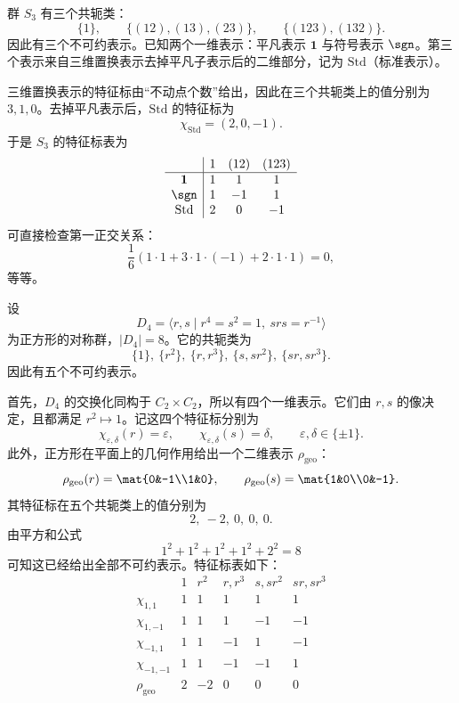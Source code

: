 \begin{example}[$S_3$ 的特征标表]
群 $S_3$ 有三个共轭类：
\[
\{1\},\qquad \{(12),(13),(23)\},\qquad \{(123),(132)\}.
\]
因此有三个不可约表示。已知两个一维表示：平凡表示 $\mathbf{1}$ 与符号表示 $\sgn$。第三个表示来自三维置换表示去掉平凡子表示后的二维部分，记为 $\mathrm{Std}$（标准表示）。

三维置换表示的特征标由“不动点个数”给出，因此在三个共轭类上的值分别为 $3,1,0$。去掉平凡表示后，$\mathrm{Std}$ 的特征标为
\[
\chi_{\mathrm{Std}}=(2,0,-1).
\]
于是 $S_3$ 的特征标表为
\[
\begin{array}{c|ccc}
 & 1 & (12) & (123)\\
\hline
\mathbf{1} & 1 & 1 & 1\\
\sgn & 1 & -1 & 1\\
\mathrm{Std} & 2 & 0 & -1
\end{array}
\]
可直接检查第一正交关系：
\[
\frac{1}{6}(1\cdot 1+3\cdot 1\cdot (-1)+2\cdot 1\cdot 1)=0,
\]
等等。
\end{example}

\begin{example}[$D_4$ 的特征标表]
设
\[
D_4=\langle r,s\mid r^4=s^2=1,\ srs=r^{-1}\rangle
\]
为正方形的对称群，$|D_4|=8$。它的共轭类为
\[
\{1\},\ \{r^2\},\ \{r,r^3\},\ \{s,sr^2\},\ \{sr,sr^3\}.
\]
因此有五个不可约表示。

首先，$D_4$ 的交换化同构于 $C_2\times C_2$，所以有四个一维表示。它们由 $r,s$ 的像决定，且都满足 $r^2\mapsto 1$。记这四个特征标分别为
\[
\chi_{\varepsilon,\delta}(r)=\varepsilon,\qquad \chi_{\varepsilon,\delta}(s)=\delta,
\qquad \varepsilon,\delta\in\{\pm 1\}.
\]
此外，正方形在平面上的几何作用给出一个二维表示 $\rho_{\mathrm{geo}}$：
\[
\rho_{\mathrm{geo}}(r)=\mat{0&-1\\1&0},
\qquad
\rho_{\mathrm{geo}}(s)=\mat{1&0\\0&-1}.
\]
其特征标在五个共轭类上的值分别为
\[
2,\ -2,\ 0,\ 0,\ 0.
\]
由平方和公式
\[
1^2+1^2+1^2+1^2+2^2=8
\]
可知这已经给出全部不可约表示。特征标表如下：
\[
\begin{array}{c|ccccc}
 & 1 & r^2 & r,r^3 & s,sr^2 & sr,sr^3\\
\hline
\chi_{1,1} & 1 & 1 & 1 & 1 & 1\\
\chi_{1,-1} & 1 & 1 & 1 & -1 & -1\\
\chi_{-1,1} & 1 & 1 & -1 & 1 & -1\\
\chi_{-1,-1} & 1 & 1 & -1 & -1 & 1\\
\rho_{\mathrm{geo}} & 2 & -2 & 0 & 0 & 0
\end{array}
\]
\end{example}

